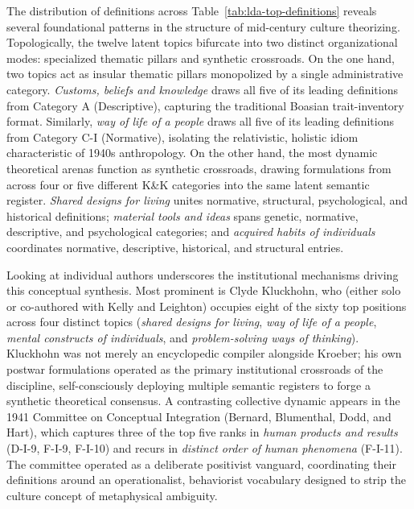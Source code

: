 \documentclass[11pt]{article}
\begin{document}
The distribution of definitions across Table~\ref{tab:lda-top-definitions} reveals several foundational patterns in the structure of mid-century culture theorizing. Topologically, the twelve latent topics bifurcate into two distinct organizational modes: specialized thematic pillars and synthetic crossroads. On the one hand, two topics act as insular thematic pillars monopolized by a single administrative category. \emph{Customs, beliefs and knowledge} draws all five of its leading definitions from Category A (Descriptive), capturing the traditional Boasian trait-inventory format. Similarly, \emph{way of life of a people} draws all five of its leading definitions from Category C-I (Normative), isolating the relativistic, holistic idiom characteristic of 1940s anthropology. On the other hand, the most dynamic theoretical arenas function as synthetic crossroads, drawing formulations from across four or five different K\&K categories into the same latent semantic register. \emph{Shared designs for living} unites normative, structural, psychological, and historical definitions; \emph{material tools and ideas} spans genetic, normative, descriptive, and psychological categories; and \emph{acquired habits of individuals} coordinates normative, descriptive, historical, and structural entries.

Looking at individual authors underscores the institutional mechanisms driving this conceptual synthesis. Most prominent is Clyde Kluckhohn, who (either solo or co-authored with Kelly and Leighton) occupies eight of the sixty top positions across four distinct topics (\emph{shared designs for living}, \emph{way of life of a people}, \emph{mental constructs of individuals}, and \emph{problem-solving ways of thinking}). Kluckhohn was not merely an encyclopedic compiler alongside Kroeber; his own postwar formulations operated as the primary institutional crossroads of the discipline, self-consciously deploying multiple semantic registers to forge a synthetic theoretical consensus. A contrasting collective dynamic appears in the 1941 Committee on Conceptual Integration (Bernard, Blumenthal, Dodd, and Hart), which captures three of the top five ranks in \emph{human products and results} (D-I-9, F-I-9, F-I-10) and recurs in \emph{distinct order of human phenomena} (F-I-11). The committee operated as a deliberate positivist vanguard, coordinating their definitions around an operationalist, behaviorist vocabulary designed to strip the culture concept of metaphysical ambiguity.
\end{document}
